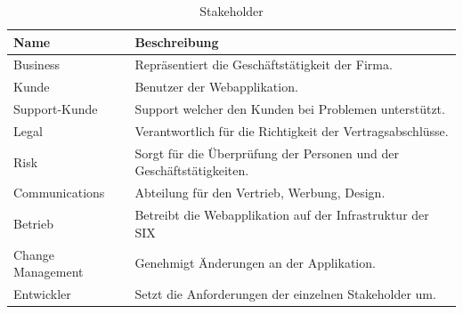 \begin{table}[H]
	\centering
	\caption{Stakeholder}
	\begin{tabular}{ | p{2cm} | p{14cm} | }
		\toprule
		{\textbf{Name}} & {\textbf{Beschreibung}} \\
		\midrule
		Business & Repräsentiert die Geschäftstätigkeit der Firma.\\ \hline
		Kunde & Benutzer der Webapplikation. \\ \hline
		Support-Kunde & Support welcher den Kunden bei Problemen unterstützt. \\ \hline
		Legal &  Verantwortlich für die Richtigkeit der Vertragsabschlüsse. \\ \hline
		Risk & Sorgt für die Überprüfung der Personen und der Geschäftstätigkeiten. \\ \hline
		Communications & Abteilung für den Vertrieb, Werbung, Design. \\ \hline
		Betrieb & Betreibt die Webapplikation auf der Infrastruktur der SIX \\ \hline
		Change Management & Genehmigt Änderungen an der Applikation. \\ \hline
		Entwickler & Setzt die Anforderungen der einzelnen Stakeholder um. \\ 
		\bottomrule
	\end{tabular}
\end{table}